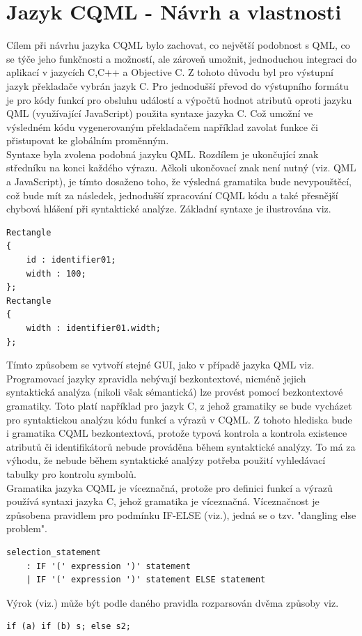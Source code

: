 \documentclass[report,11pt]{elsarticle}
\begin{document}
\section{\label{SEC:Intro}Jazyk CQML - Návrh a vlastnosti}
Cílem při návrhu jazyka CQML bylo zachovat, co největší podobnost s QML, co se týče jeho funkčnosti a možností, ale zároveň umožnit, jednoduchou integraci do aplikací v jazycích C,C++ a Objective C. Z tohoto důvodu byl pro výstupní jazyk překladače vybrán jazyk C. Pro jednodušší převod do výstupního formátu je pro kódy funkcí pro obsluhu událostí a výpočtů hodnot atributů oproti jazyku QML (využívající JavaScript) použita syntaxe jazyka C. Což umožní ve výsledném kódu vygenerovaným překladačem  například zavolat funkce či přistupovat ke globálním proměnným.\\
Syntaxe byla zvolena podobná jazyku QML. Rozdílem je ukončující znak středníku na konci každého výrazu. Ačkoli ukončovací znak není nutný (viz. QML a JavaScript), je tímto dosaženo toho, že výsledná gramatika bude nevypouštěcí, což bude mít za následek, jednodušší zpracování CQML kódu a také přesnější chybová hlášení při syntaktické analýze. Základní syntaxe je ilustrována viz.
\begin{lstlisting}[frame=single,caption=Tvorba dvou jednoduchých elementů pomocí jazyka CQML.,label=Tvorba dvou jednoduchých elementů pomocí jazyka CQML.]
Rectangle
{
	id : identifier01;
	width : 100;
};
Rectangle
{
	width : identifier01.width;
};
\end{lstlisting}
Tímto způsobem se vytvoří stejné GUI, jako v případě jazyka QML viz. 
\\
Programovací jazyky zpravidla nebývají bezkontextové, nicméně jejich syntaktická analýza (nikoli však sémantická) lze provést pomocí bezkontextové gramatiky. Toto platí například pro jazyk C, z jehož gramatiky se bude vycházet pro syntaktickou analýzu kódu funkcí a výrazů v CQML. Z tohoto hlediska bude i gramatika CQML bezkontextová, protože typová kontrola a kontrola existence atributů či identifikátorů nebude prováděna během syntaktické analýzy. To má za výhodu, že nebude během syntaktické analýzy potřeba použití vyhledávací tabulky pro kontrolu symbolů.\\
Gramatika jazyka CQML je víceznačná, protože pro definici funkcí a výrazů používá syntaxi jazyka C, jehož gramatika je víceznačná. Víceznačnost je způsobena pravidlem pro podmínku IF-ELSE (viz.), jedná se o tzv. "dangling else problem".\\
\begin{lstlisting}[frame=single,caption=Víceznačné IF-ELSE pravidlo gramatiky.]
selection_statement
	: IF '(' expression ')' statement
	| IF '(' expression ')' statement ELSE statement 
\end{lstlisting}
Výrok (viz.) může být podle daného pravidla rozparsován dvěma způsoby viz.
\begin{lstlisting}[frame=single,caption=Příklad víceznačného výroku IF-ELSE]
if (a) if (b) s; else s2;
\end{lstlisting}
\end{document}
